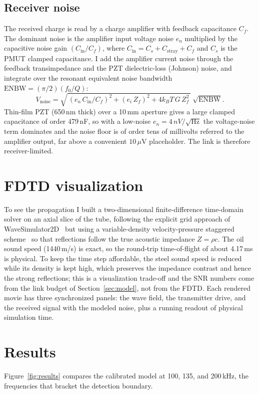 \documentclass{article}
\newcommand{\Cs}{479\,nF}
\newcommand{\en}{4\,nV/\!\sqrt{\text{Hz}}}
\newcommand{\fbound}{135}   %
\begin{document}
\subsection{Receiver noise}\label{sec:noise}
The received charge is read by a charge amplifier with feedback capacitance $C_f$. The
dominant noise is the amplifier input voltage noise $e_n$ multiplied by the capacitive noise
gain $(C_{\mathrm{in}}/C_f)$, where $C_{\mathrm{in}}=C_s+C_{\mathrm{stray}}+C_f$ and $C_s$ is
the PMUT clamped capacitance. I add the amplifier current noise through the feedback
transimpedance and the PZT dielectric-loss (Johnson) noise, and integrate over the resonant
equivalent noise bandwidth $\mathrm{ENBW}=(\pi/2)(f_0/Q)$:
\begin{equation}
V_{\mathrm{noise}} = \sqrt{\,(e_n\,C_{\mathrm{in}}/C_f)^2 + (e_i\,Z_f)^2 + 4 k_B T\,G\,Z_f^2\,}\;\sqrt{\mathrm{ENBW}} .
\label{eq:noise}
\end{equation}
Thin-film PZT (650\,nm thick) over a 10\,mm aperture gives a large clamped capacitance of
order \Cs, so with a low-noise $e_n=\en$ the voltage-noise term dominates and the noise floor
is of order tens of millivolts referred to the amplifier output, far above a convenient
$10\,\mu$V placeholder. The link is therefore receiver-limited.

\section{FDTD visualization}\label{sec:fdtd}
To see the propagation I built a two-dimensional finite-difference time-domain solver on an
axial slice of the tube, following the explicit grid approach of WaveSimulator2D~\citep{wavesim2d} but using a
variable-density velocity-pressure staggered scheme~\citep{virieux1986} so that reflections follow the true
acoustic impedance $Z=\rho c$. The oil sound speed (1440\,m/s) is exact, so the round-trip
time-of-flight of about 4.17\,ms is physical. To keep the time step affordable, the steel
sound speed is reduced while its density is kept high, which preserves the impedance contrast
and hence the strong reflections; this is a visualization trade-off and the SNR numbers come
from the link budget of Section~\ref{sec:model}, not from the FDTD. Each rendered movie has
three synchronized panels: the wave field, the transmitter drive, and the received signal with
the modeled noise, plus a running readout of physical simulation time.

\section{Results}\label{sec:results}
Figure~\ref{fig:results} compares the calibrated model at 100, \fbound, and 200\,kHz, the
frequencies that bracket the detection boundary.
\end{document}
